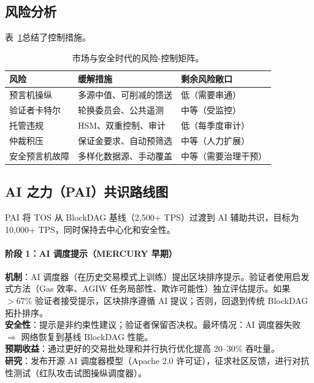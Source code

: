 \documentclass[11pt]{article}
\begin{document}
\subsection{风险分析}
表~\ref{tab:risk-markets}总结了控制措施。

\begin{table}[H]
  \centering
  \begin{tabular}{p{}p{}p{}}
    \toprule
    \textbf{风险} & \textbf{缓解措施} & \textbf{剩余风险敞口} \\
    \midrule
    预言机操纵 & 多源中值、可削减的馈送 & 低（需要串通） \\
    验证者卡特尔 & 轮换委员会、公共遥测 & 中等（受监控） \\
    托管违规 & HSM、双重控制、审计 & 低（每季度审计） \\
    仲裁积压 & 保证金要求、自动预筛选 & 中等（人力扩展） \\
    安全预言机故障 & 多样化数据源、手动覆盖 & 中等（需要治理干预） \\
    \bottomrule
  \end{tabular}
  \caption{市场与安全时代的风险-控制矩阵。}
  \label{tab:risk-markets}
\end{table}

\subsection{AI 之力（PAI）共识路线图}
\label{sec:pai-roadmap}
PAI 将 TOS 从 BlockDAG 基线（2,500+ TPS）过渡到 AI 辅助共识，目标为 10,000+ TPS，同时保持去中心化和安全性。

\paragraph{阶段 1：AI 调度提示（MERCURY 早期）}
\textbf{机制}：AI 调度器（在历史交易模式上训练）提出区块排序提示。验证者使用启发式方法（Gas 效率、AGIW 任务局部性、欺诈可能性）独立评估提示。如果 $>67\%$ 验证者接受提示，区块排序遵循 AI 提议；否则，回退到传统 BlockDAG 拓扑排序。\\
\textbf{安全性}：提示是非约束性建议；验证者保留否决权。最坏情况：AI 调度器失败 $\Rightarrow$ 网络恢复到基线 BlockDAG 性能。\\
\textbf{预期收益}：通过更好的交易批处理和并行执行优化提高 20--30\% 吞吐量。\\
\textbf{研究}：发布开源 AI 调度器模型（Apache 2.0 许可证），征求社区反馈，进行对抗性测试（红队攻击试图操纵调度器）。
\end{document}
